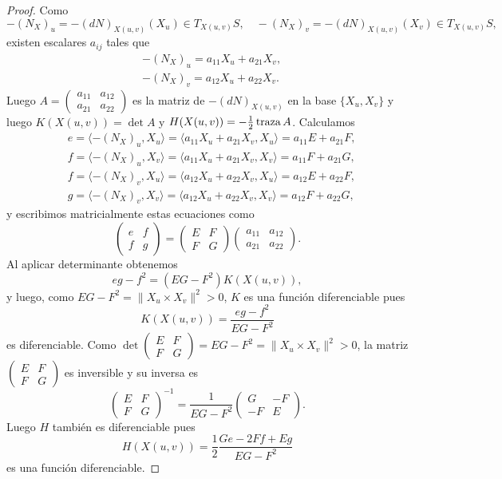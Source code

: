 \begin{proof}
	Como 
	\[
		-(N_X)_u=-(dN)_{X(u,v)}(X_u)\in T_{X(u,v)}S,\quad  
		-(N_X)_v=-(dN)_{X(u,v)}(X_v)\in T_{X(u,v)}S,
	\]
	existen escalares $a_{ij}$ tales que
	\begin{align*}
		&-(N_X)_u=a_{11}X_u+a_{21}X_v,\\
		&-(N_X)_v=a_{12}X_u+a_{22}X_v.
	\end{align*}
	Luego 
	$A=\begin{pmatrix}
		a_{11} & a_{12}\\
		a_{21} & a_{22}
	\end{pmatrix}$
	es la matriz de $-(dN)_{X(u,v)}$ en la base $\{X_u,X_v\}$ y luego
	$K(X(u,v))=\det A$ y $H(X(u,v))=-\frac12\operatorname{traza} A$. Calculamos
	\begin{align*}
		&e=\langle -(N_X)_u,X_u\rangle=\langle a_{11}X_u+a_{21}X_v,X_u\rangle=a_{11}E+a_{21}F,\\
		&f=\langle -(N_X)_u,X_v\rangle=\langle a_{11}X_u+a_{21}X_v,X_v\rangle=a_{11}F+a_{21}G,\\
		&f=\langle -(N_X)_v,X_u\rangle=\langle a_{12}X_u+a_{22}X_v,X_u\rangle=a_{12}E+a_{22}F,\\
		&g=\langle -(N_X)_v,X_v\rangle=\langle a_{12}X_u+a_{22}X_v,X_v\rangle=a_{12}F+a_{22}G,
	\end{align*}
	y escribimos matricialmente estas ecuaciones como
	\[
		\begin{pmatrix}
			e & f\\
			f & g
		\end{pmatrix}
		=\begin{pmatrix}
			E & F\\
			F & G
		\end{pmatrix}
		\begin{pmatrix}
			a_{11} & a_{12}\\
			a_{21} & a_{22}
		\end{pmatrix}.
	\]
	Al aplicar determinante obtenemos
	\[
		eg-f^2=(EG-F^2)K(X(u,v)),
	\]
	y luego, como $EG-F^2=\|X_u\times X_v\|^2>0$, $K$ es una función diferenciable
	pues 
	\[
		K(X(u,v))=\frac{eg-f^2}{EG-F^2}
	\]
	es diferenciable. 
	Como $\det
	\begin{pmatrix}
		E & F\\
		F & G
	\end{pmatrix}
	=EG-F^2=\|X_u\times X_v\|^2>0$, 
	la matriz $\begin{pmatrix}
		E & F\\
		F & G
	\end{pmatrix}$
	es inversible y su inversa es 
	\[
		\begin{pmatrix}
			E & F\\
			F & G
		\end{pmatrix}^{-1}
		=\frac{1}{EG-F^2}\begin{pmatrix}
			G & -F\\
			-F & E
		\end{pmatrix}.
	\]
	Luego $H$ también es diferenciable pues 
	\[
		H(X(u,v))=\frac{1}{2}\frac{Ge-2Ff+Eg}{EG-F^2}
	\]
	es una función diferenciable.
\end{proof}

